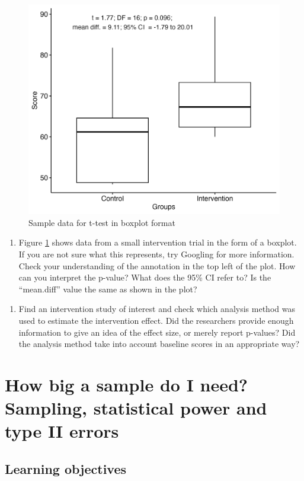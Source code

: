 \documentclass{krantz}
\providecommand{\tightlist}{%
\setlength{\itemsep}{0pt}\setlength{\parskip}{0pt}}
\begin{document}
\begin{figure}[H]
\includegraphics[width=0.6\linewidth]{images_bw/boxeg} \caption{Sample data for t-test in boxplot format}\label{fig:boxeg}
\end{figure}
\begin{enumerate}
\def\labelenumi{\arabic{enumi}.}
\tightlist
\item
  Figure \ref{fig:boxeg} shows data from a small intervention trial in the form of a boxplot. If you are not sure what this represents, try Googling for more information. Check your understanding of the annotation in the top left of the plot. How can you interpret the p-value? What does the 95\% CI refer to? Is the ``mean.diff'' value the same as shown in the plot?
\end{enumerate}





\begin{enumerate}
\def\labelenumi{\arabic{enumi}.}
\setcounter{enumi}{1}
\tightlist
\item
  Find an intervention study of interest and check which analysis method was used to estimate the intervention effect. Did the researchers provide enough information to give an idea of the effect size, or merely report p-values? Did the analysis method take into account baseline scores in an appropriate way?
\end{enumerate}

\hypertarget{power}{%
\chapter{How big a sample do I need? Sampling, statistical power and type II errors}\label{power}}

\hypertarget{learning-objectives-10}{%
\section{Learning objectives}\label{learning-objectives-10}}
\end{document}
